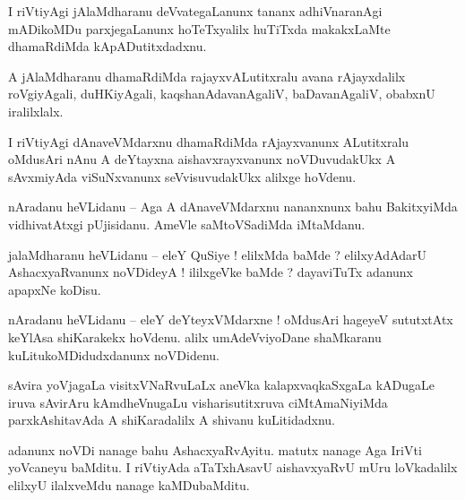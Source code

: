 \documentclass{article}
\begin{document}
\begin{mn}%
I riVtiyAgi jAlaMdharanu deVvategaLanunx tananx adhiVnaranAgi mADikoMDu parxjegaLanunx hoTeTxyalilx 
huTiTxda makakxLaMte dhamaRdiMda kApADutitxdadxnu.
\end{mn}

\begin{mn}%
A jAlaMdharanu dhamaRdiMda rajayxvALutitxralu avana rAjayxdalilx roVgiyAgali, duHKiyAgali, 
kaqshanAdavanAgaliV, baDavanAgaliV, obabxnU iralilxlalx.
\end{mn}

\begin{mn}%
I riVtiyAgi dAnaveVMdarxnu dhamaRdiMda rAjayxvanunx ALutitxralu oMdusAri nAnu A deYtayxna 
aishavxrayxvanunx noVDuvudakUkx A sAvxmiyAda viSuNxvanunx seVvisuvudakUkx alilxge hoVdenu.
\end{mn}


\begin{mn}%
nAradanu heVLidanu -- Aga A dAnaveVMdarxnu nananxnunx bahu BakitxyiMda vidhivatAtxgi pUjisidanu. 
AmeVle saMtoVSadiMda iMtaMdanu.
\end{mn}

\begin{mn}%
jalaMdharanu heVLidanu -- eleY QuSiye ! elilxMda baMde ? elilxyAdAdarU AshacxyaRvanunx noVDideyA ! 
ililxgeVke baMde ? dayaviTuTx adanunx apapxNe koDisu.
\end{mn}

\begin{mn}%
nAradanu heVLidanu -- eleY deYteyxVMdarxne ! oMdusAri hageyeV sututxtAtx keYlAsa shiKarakekx 
hoVdenu. alilx umAdeVviyoDane shaMkaranu kuLitukoMDidudxdanunx noVDidenu.
\end{mn}

\begin{mn}%
sAvira yoVjagaLa visitxVNaRvuLaLx aneVka kalapxvaqkaSxgaLa kADugaLe iruva sAvirAru kAmdheVnugaLu 
visharisutitxruva ciMtAmaNiyiMda parxkAshitavAda A shiKaradalilx A shivanu kuLitidadxnu.
\end{mn}

\begin{mn}%
adanunx noVDi nanage bahu AshacxyaRvAyitu. matutx nanage Aga IriVti yoVcaneyu baMditu. I riVtiyAda 
aTaTxhAsavU aishavxyaRvU mUru loVkadalilx elilxyU ilalxveMdu nanage kaMDubaMditu. 
\end{mn}
\end{document}
